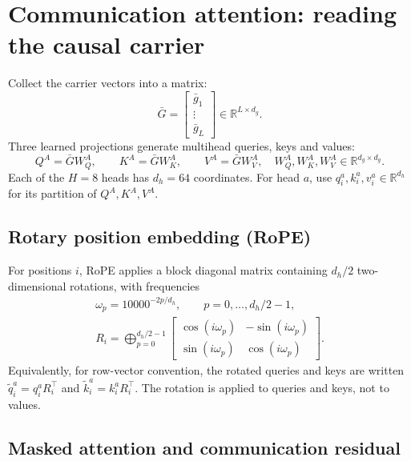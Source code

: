 \documentclass[11pt,a4paper]{article}
\newcommand{\R}{\mathbb{R}}
\newcommand{\gbar}{\bar g}
\newcommand{\Gbar}{\bar G}
\newcommand{\T}{\top}
\begin{document}
\section{Communication attention: reading the causal carrier}\label{sec:attention}

Collect the carrier vectors into a matrix:
\begin{equation}
\Gbar=\begin{bmatrix}\gbar_1\\ \vdots\\ \gbar_L\end{bmatrix}\in\R^{L\times d_g}.
\end{equation}
Three learned projections generate multihead queries, keys and values:
\begin{equation}
Q^A=\Gbar W_Q^A,\qquad K^A=\Gbar W_K^A,\qquad V^A=\Gbar W_V^A,\quad W_Q^A,W_K^A,W_V^A\in\R^{d_g\times d_g}.
\end{equation}
Each of the $H=8$ heads has $d_h=64$ coordinates. For head $a$, use $q_i^a,k_i^a,v_i^a\in\R^{d_h}$ for
its partition of $Q^A,K^A,V^A$.

\subsection{Rotary position embedding (RoPE)}

For positions $i$, RoPE applies a block diagonal matrix containing $d_h/2$ two-dimensional rotations,
with frequencies
\begin{gather}
\omega_p=10000^{-2p/d_h},\qquad p=0,\dots,d_h/2-1,\\
R_i=\bigoplus_{p=0}^{d_h/2-1}\begin{bmatrix}\cos(i\omega_p)&-\sin(i\omega_p)\\ \sin(i\omega_p)&\cos(i\omega_p)\end{bmatrix}.
\end{gather}
Equivalently, for row-vector convention, the rotated queries and keys are written
$\tilde q_i^a=q_i^aR_i^{\T}$ and $\tilde k_i^a=k_i^aR_i^{\T}$. The rotation is applied to queries and
keys, not to values.

\subsection{Masked attention and communication residual}
\end{document}
